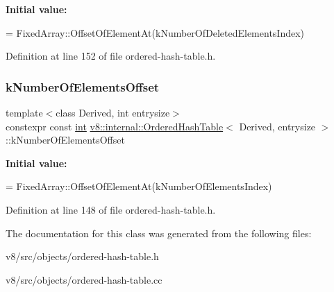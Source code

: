 {\bfseries Initial value\+:}
\begin{DoxyCode}
=
      FixedArray::OffsetOfElementAt(kNumberOfDeletedElementsIndex)
\end{DoxyCode}


Definition at line 152 of file ordered-\/hash-\/table.\+h.

\mbox{\label{classv8_1_1internal_1_1OrderedHashTable_aef9bd3561333fbc30925d79b4ae96f84}} 
\subsubsection{\texorpdfstring{k\+Number\+Of\+Elements\+Offset}{kNumberOfElementsOffset}}
{\footnotesize\ttfamily template$<$class Derived, int entrysize$>$ \\
constexpr const \mbox{\hyperlink{classint}{int}} \mbox{\hyperlink{classv8_1_1internal_1_1OrderedHashTable}{v8\+::internal\+::\+Ordered\+Hash\+Table}}$<$ Derived, entrysize $>$\+::k\+Number\+Of\+Elements\+Offset\hspace{0.3cm}{\ttfamily [static]}}

{\bfseries Initial value\+:}
\begin{DoxyCode}
=
      FixedArray::OffsetOfElementAt(kNumberOfElementsIndex)
\end{DoxyCode}


Definition at line 148 of file ordered-\/hash-\/table.\+h.



The documentation for this class was generated from the following files\+:\begin{DoxyCompactItemize}
\item 
v8/src/objects/ordered-\/hash-\/table.\+h\item 
v8/src/objects/ordered-\/hash-\/table.\+cc\end{DoxyCompactItemize}
